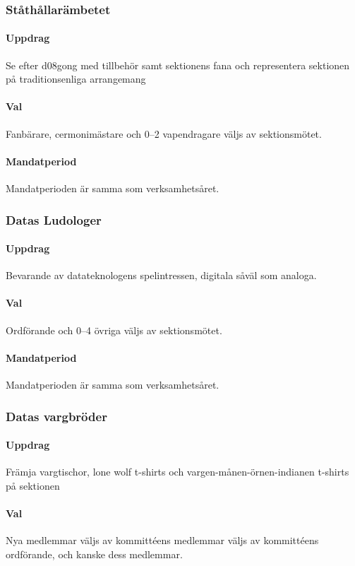 \subsubsection{Ståthållarämbetet}
\paragraph{Uppdrag}
Se efter d08gong med tillbehör samt sektionens fana och representera sektionen på traditionsenliga arrangemang
\paragraph{Val}
Fanbärare, cermonimästare och 0--2 vapendragare väljs av sektionsmötet.
\paragraph{Mandatperiod}
Mandatperioden är samma som verksamhetsåret. 
\subsubsection{Datas Ludologer}
\paragraph{Uppdrag}
Bevarande av datateknologens spelintressen, digitala såväl som analoga.
\paragraph{Val}
Ordförande och 0--4 övriga väljs av sektionsmötet.
\paragraph{Mandatperiod}
Mandatperioden är samma som verksamhetsåret. 
\subsubsection{Datas vargbröder}
\paragraph{Uppdrag}
Främja vargtischor, lone wolf t-shirts och vargen-månen-örnen-indianen t-shirts på sektionen 
\paragraph{Val}
Nya medlemmar väljs av kommittéens medlemmar väljs av kommittéens ordförande, och kanske dess medlemmar.
